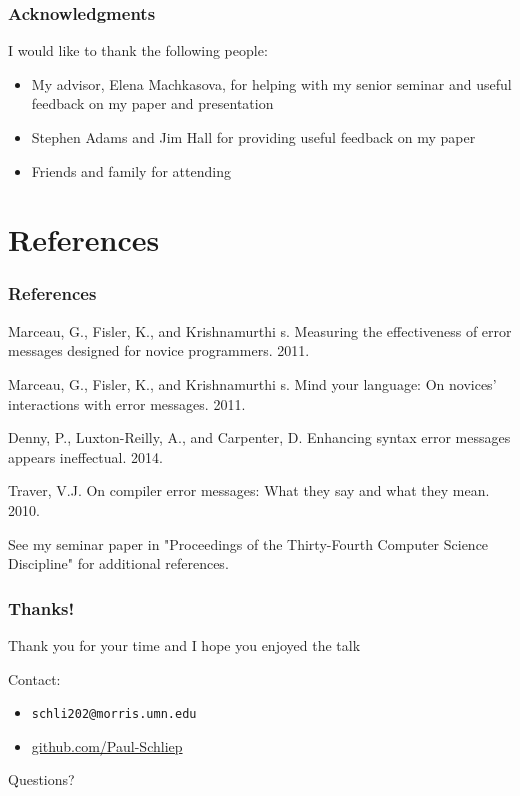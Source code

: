 \documentclass{beamer}
\newcommand{\linespace}{\vskip 0.25cm}
\begin{document}
\begin{frame}
	\frametitle{Acknowledgments}
	I would like to thank the following people:
		\begin{itemize}
			\item My advisor, Elena Machkasova, for helping with my senior seminar and useful feedback on my paper and presentation
			\item Stephen Adams and Jim Hall for providing useful feedback on my paper
			\item Friends and family for attending
		\end{itemize}

\end{frame}

\section*{References}

\begin{frame} 
	\frametitle{References} 
	
	\begin{thebibliography}{lskdjf}
	
Marceau, G., Fisler, K., and Krishnamurthi s.
\newblock Measuring the effectiveness of error messages designed for novice programmers. 2011.

Marceau, G., Fisler, K., and Krishnamurthi s.
\newblock Mind your language: On novices' interactions with error messages. 2011.

Denny, P., Luxton-Reilly, A., and Carpenter, D.
\newblock Enhancing syntax error messages appears ineffectual. 2014.
	
	Traver, V.J.
\newblock On compiler error messages: What they say and what they mean. 2010.
  
  	\end{thebibliography}
	
	\linespace
	\begin{center}
	See my seminar paper in "Proceedings of the Thirty-Fourth Computer Science Discipline" for additional references.
	\end{center}
\end{frame} 

\begin{frame}
	\frametitle{Thanks!}
	
	Thank you for your time and I hope you enjoyed the talk
		
	\linespace
	\linespace
	
	Contact:  
	\begin{itemize}
		\item \texttt{schli202@morris.umn.edu}
		\item \url{github.com/Paul-Schliep}
	\end{itemize}
	
	\linespace
	\linespace
	
	\begin{center}
	{\huge Questions?}
	\end{center}
\end{frame}
\end{document}
